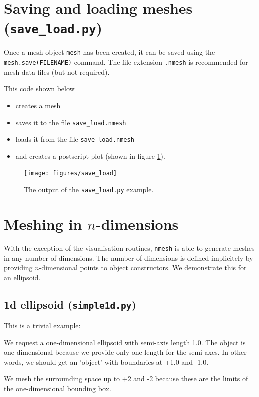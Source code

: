\documentclass[10pt,a4paper]{book}
\newcommand{\py}[1]{\texttt{\color{blue}#1}}
\newcommand{\nmesh}{\texttt{nmesh}}
\begin{document}
\section{Saving and loading meshes (\texttt{save\_load.py})}
\label{sec:saveload}

Once a mesh object \py{mesh} has been created, it can be saved using the
\py{mesh.save(FILENAME)} command. The file extension \py{.nmesh} is
recommended for mesh data files (but not required).

This code shown below
\begin{itemize}
\item creates a mesh
\item saves it to the file \texttt{save\_load.nmesh}
\item loads it from the file \texttt{save\_load.nmesh}
\item and creates a postscript plot (shown in figure \ref{fig:saveload}).
\end{itemize}

\begin{figure}[tbhp]
\centerline{\texttt{[image: figures/save\_load]}}
\caption{\label{fig:saveload} The output of the \py{save\_load.py} example.}\end{figure}


\section{Meshing in $n$-dimensions}
\label{sec:meshing-n-dimensions}

With the exception of the visualisation routines, \nmesh{} is able to
generate meshes in any number of dimensions. The number of dimensions
is defined implicitely by providing $n$-dimensional points to object constructors. We demonstrate this for an ellipsoid.

\subsection{1d ellipsoid (\texttt{simple1d.py})}

This is a trivial example:


We request a one-dimensional ellipsoid with semi-axis length 1.0. The object is one-dimensional because we provide only one length for the semi-axes. In other words, we should get an 'object' with boundaries at +1.0 and -1.0. 

We mesh the surrounding space up to +2 and -2 because these are the limits of the one-dimensional bounding box. 
\end{document}
